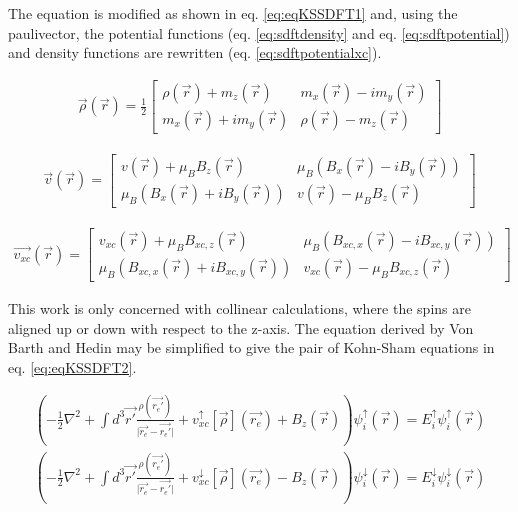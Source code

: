 The equation is modified as shown in eq. \ref{eq:eqKSSDFT1} and, using the \gls{paulivector}, the potential functions (eq. \ref{eq:sdftdensity} and eq. \ref{eq:sdftpotential})\cite{spindft4} and density functions are rewritten (eq. \ref{eq:sdftpotentialxc})\cite{spindft4}.

\begin{equation}
\begin{split}
\vec{\rho}(\vec{r}) = \frac{1}{2} \begin{bmatrix} \rho(\vec{r}) + m_z(\vec{r}) & m_x(\vec{r}) - i m_y(\vec{r}) \\ m_x(\vec{r}) + i m_y(\vec{r}) & \rho(\vec{r}) - m_z(\vec{r}) \end{bmatrix}
\label{eq:sdftdensity}
\end{split}
\end{equation}

\begin{equation}
\begin{split}
\vec{v}(\vec{r}) = \begin{bmatrix} v(\vec{r}) + \mu_B B_z(\vec{r}) & \mu_B (B_x(\vec{r}) - i B_y(\vec{r})) \\ \mu_B (B_x(\vec{r}) + i B_y(\vec{r})) & v(\vec{r}) - \mu_B B_z(\vec{r}) \end{bmatrix}
\label{eq:sdftpotential}
\end{split}
\end{equation}

\begin{equation}
\begin{split}
\vec{v_{xc}}(\vec{r}) = \begin{bmatrix} v_{xc}(\vec{r}) + \mu_B B_{xc, z}(\vec{r}) & \mu_B (B_{xc, x}(\vec{r}) - i B_{xc, y}(\vec{r})) \\ \mu_B (B_{xc, x}(\vec{r}) + i B_{xc, y}(\vec{r})) & v_{xc}(\vec{r}) - \mu_B B_{xc, z}(\vec{r}) \end{bmatrix}
\label{eq:sdftpotentialxc}
\end{split}
\end{equation}

This work is only concerned with collinear calculations, where the spins are aligned up or down with respect to the z-axis.  The equation derived by Von Barth and Hedin may be simplified to give the pair of Kohn-Sham equations in eq. \ref{eq:eqKSSDFT2}.

\begin{equation}
\begin{split}
\left(-\frac{1}{2} \nabla^2  + \int d^3\vec{r'} \frac{\rho(\vec{r_{e}'})}{\lvert \vec{r_{e}} - \vec{r_{e}'} \rvert} + v^{\uparrow}_{xc}[\vec{\rho}](\vec{r_{e}}) + B_{z}(\vec{r}) \right)\psi^{\uparrow}_{i}(\vec{r}) = E^{\uparrow}_i \psi^{\uparrow}_{i}(\vec{r})  \\
\left(-\frac{1}{2} \nabla^2  + \int d^3\vec{r'} \frac{\rho(\vec{r_{e}'})}{\lvert \vec{r_{e}} - \vec{r_{e}'} \rvert} + v^{\downarrow}_{xc}[\vec{\rho}](\vec{r_{e}}) - B_{z}(\vec{r}) \right)\psi^{\downarrow}_{i}(\vec{r}) = E^{\downarrow}_i \psi^{\downarrow}_{i}(\vec{r})
\label{eq:eqKSSDFT2}
\end{split}
\end{equation}

